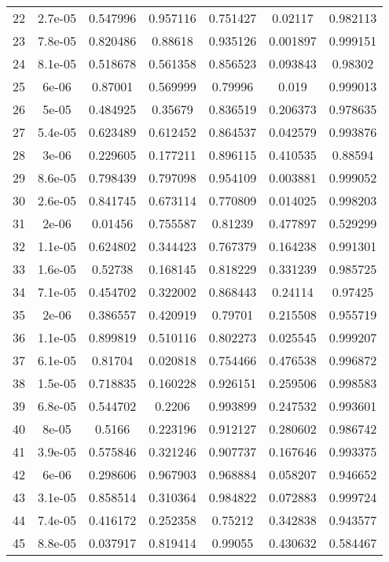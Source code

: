 \begin{table}
\begin{tabular}{c|c|c|c|c|c|c}
22 & 2.7e-05 & 0.547996 & 0.957116 & 0.751427 & 0.02117 & 0.982113\\
23 & 7.8e-05 & 0.820486 & 0.88618 & 0.935126 & 0.001897 & 0.999151\\
24 & 8.1e-05 & 0.518678 & 0.561358 & 0.856523 & 0.093843 & 0.98302\\
25 & 6e-06 & 0.87001 & 0.569999 & 0.79996 & 0.019 & 0.999013\\
26 & 5e-05 & 0.484925 & 0.35679 & 0.836519 & 0.206373 & 0.978635\\
27 & 5.4e-05 & 0.623489 & 0.612452 & 0.864537 & 0.042579 & 0.993876\\
28 & 3e-06 & 0.229605 & 0.177211 & 0.896115 & 0.410535 & 0.88594\\
29 & 8.6e-05 & 0.798439 & 0.797098 & 0.954109 & 0.003881 & 0.999052\\
30 & 2.6e-05 & 0.841745 & 0.673114 & 0.770809 & 0.014025 & 0.998203\\
31 & 2e-06 & 0.01456 & 0.755587 & 0.81239 & 0.477897 & 0.529299\\
32 & 1.1e-05 & 0.624802 & 0.344423 & 0.767379 & 0.164238 & 0.991301\\
33 & 1.6e-05 & 0.52738 & 0.168145 & 0.818229 & 0.331239 & 0.985725\\
34 & 7.1e-05 & 0.454702 & 0.322002 & 0.868443 & 0.24114 & 0.97425\\
35 & 2e-06 & 0.386557 & 0.420919 & 0.79701 & 0.215508 & 0.955719\\
36 & 1.1e-05 & 0.899819 & 0.510116 & 0.802273 & 0.025545 & 0.999207\\
37 & 6.1e-05 & 0.81704 & 0.020818 & 0.754466 & 0.476538 & 0.996872\\
38 & 1.5e-05 & 0.718835 & 0.160228 & 0.926151 & 0.259506 & 0.998583\\
39 & 6.8e-05 & 0.544702 & 0.2206 & 0.993899 & 0.247532 & 0.993601\\
40 & 8e-05 & 0.5166 & 0.223196 & 0.912127 & 0.280602 & 0.986742\\
41 & 3.9e-05 & 0.575846 & 0.321246 & 0.907737 & 0.167646 & 0.993375\\
42 & 6e-06 & 0.298606 & 0.967903 & 0.968884 & 0.058207 & 0.946652\\
43 & 3.1e-05 & 0.858514 & 0.310364 & 0.984822 & 0.072883 & 0.999724\\
44 & 7.4e-05 & 0.416172 & 0.252358 & 0.75212 & 0.342838 & 0.943577\\
45 & 8.8e-05 & 0.037917 & 0.819414 & 0.99055 & 0.430632 & 0.584467\\
\end{tabular}
\end{table}
